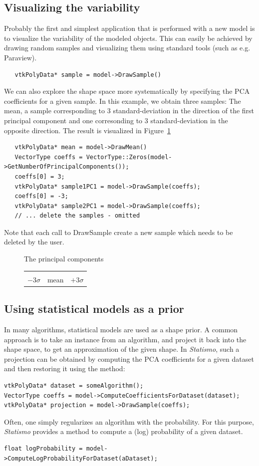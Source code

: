 \documentclass{InsightArticle}
\newcommand{\Statismo}{\emph{Statismo}\xspace}
\begin{document}
\subsection{Visualizing the variability} \label{sec:visvariability}
Probably the first and simplest application that is performed with a new model is to visualize the variability of the modeled objects. 
This can easily be achieved by drawing random samples and visualizing them using standard tools (such as e.g. Paraview). 
\begin{verbatim}
   vtkPolyData* sample = model->DrawSample()
\end{verbatim}
We can also explore the shape space more systematically by specifying
the PCA coefficients for a given sample. In this example, we obtain three samples:
The mean, a sample corresponding to 3 standard-deviation in the direction of the
first principal component and one corresonding to 3 standard-deviation in the opposite direction.
The result is visualized in Figure~\ref{fig:vispca}
\begin{verbatim}
   vtkPolyData* mean = model->DrawMean()
   VectorType coeffs = VectorType::Zeros(model->GetNumberOfPrincipalComponents());
   coeffs[0] = 3;
   vtkPolyData* sample1PC1 = model->DrawSample(coeffs);
   coeffs[0] = -3;
   vtkPolyData* sample2PC1 = model->DrawSample(coeffs);
   // ... delete the samples - omitted
\end{verbatim}
Note that each call to DrawSample create a new sample which needs to be deleted by the user.
\begin{figure}
  The principal components
  \begin{tabular}{ccc}
    && \\
    $-3 \sigma$ & mean & $+3 \sigma$
  \end{tabular}
    \label{fig:vispca}
\end{figure}


\subsection{Using statistical models as  a prior}
In many algorithms, statistical models are used as a shape prior. 
A common approach is to take an instance from an algorithm, and project it back into the 
shape space, to get an approximation of the given shape. In \Statismo, such a projection can be
obtained by computing the PCA coefficients for a given dataset and then restoring it using the 
 method:
\begin{verbatim}
vtkPolyData* dataset = someAlgorithm();
VectorType coeffs = model->ComputeCoefficientsForDataset(dataset);
vtkPolyData* projection = model->DrawSample(coeffs);
\end{verbatim}
Often, one simply regularizes an algorithm with the probability. For this purpose, \Statismo 
provides a method to compute a (log) probability of a given dataset. 
\begin{verbatim}
float logProbability = model->ComputeLogProbabilityForDataset(aDataset);
\end{verbatim}
\end{document}

